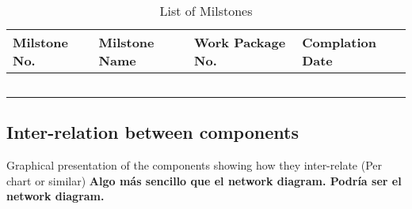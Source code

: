 \begin{longtable}[H]{p{2.5cm} p{3.9cm} p{4cm} p{3cm} }
	\toprule[2pt]
	
	\textbf{Milstone No.} & \textbf{Milstone Name} & \textbf{Work Package No.} & \textbf{Complation Date} \\
	
	\midrule[1.5pt] 
	\endhead
	
	 &  &  & \vspace{0.2cm} \\
	
	\midrule

	 &  &  & \vspace{0.2cm} \\
	
	\midrule
	
	 &  &  &  \vspace{0.2cm} \\

	\midrule

 	 &  &  &  \vspace{0.2cm} \\
	
	\bottomrule[2pt]
	
	\caption{List of Milstones}
	\label{workpackages}
\end{longtable}



\subsection{Inter-relation between components}

Graphical presentation of the components showing how they inter-relate (Per chart or similar) \textbf{Algo más sencillo que el network diagram. Podría ser el network diagram.}


